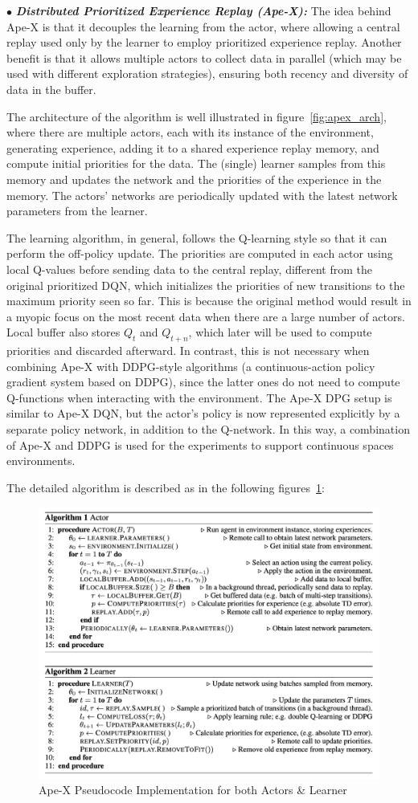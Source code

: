 $\bullet$ \textit{\textbf{Distributed Prioritized Experience Replay (Ape-X):}} The idea behind Ape-X is that it decouples the learning from the actor, where allowing a central replay used only by the learner to employ prioritized experience replay. Another benefit is that it allows multiple actors to collect data in parallel (which may be used with different exploration strategies), ensuring both recency and diversity of data in the buffer. 

The architecture of the algorithm is well illustrated in figure~\ref{fig:apex_arch}, where there are multiple actors, each with its instance of the environment, generating experience, adding it to a shared experience replay memory, and compute initial priorities for the data. The (single) learner samples from this memory and updates the network and the priorities of the experience in the memory. The actors’ networks are periodically updated with the latest network parameters from the learner.

The learning algorithm, in general, follows the Q-learning style so that it can perform the off-policy update. 
The priorities are computed in each actor using local Q-values before sending data to the central replay, different from the original prioritized DQN, which initializes the priorities of new transitions to the maximum priority seen so far. This is because the original method would result in a myopic focus on the most recent data when there are a large number of actors. Local buffer also stores \(Q_{t}\) and \(Q_{t+n}\), which later will be used to compute priorities and discarded afterward. In contrast, this is not necessary when combining Ape-X with DDPG-style algorithms (a continuous-action policy gradient system based on DDPG), since the latter ones do not need to compute Q-functions when interacting with the environment. The Ape-X DPG setup is similar to Ape-X DQN, but the actor’s policy is now represented explicitly by a separate policy network, in addition to the Q-network.
In this way, a combination of Ape-X and DDPG is used for the experiments to support continuous spaces environments.

The detailed algorithm is described as in the following figures~\ref{fig:apex_algorithm}:
\begin{figure}[!htb]
	\centering
	\includegraphics[width=0.7\linewidth]{figures/apex.png}
	\caption{Ape-X Pseudocode Implementation for both Actors \& Learner}
	\label{fig:apex_algorithm}
\end{figure}